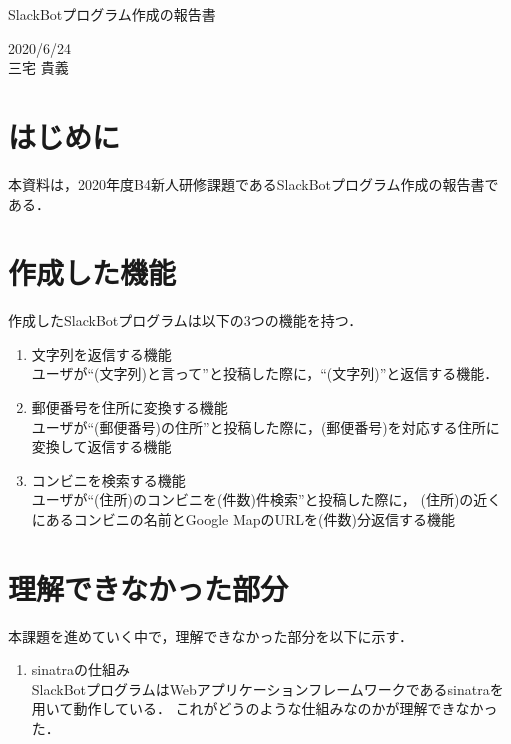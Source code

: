\documentclass[12pt]{jsarticle}
\begin{document}
\begin{center}
{\LARGE SlackBotプログラム作成の報告書}
\end{center}

\begin{flushright}
  2020/6/24\\
  三宅 貴義
\end{flushright}
\section{はじめに}
\label{sec:introduction}
本資料は，2020年度B4新人研修課題であるSlackBotプログラム作成の報告書である．


\section{作成した機能}\label{sec:hoge}
作成したSlackBotプログラムは以下の3つの機能を持つ．

\begin{enumerate}
  \item 文字列を返信する機能\\
        ユーザが“(文字列)と言って”と投稿した際に，“(文字列)”と返信する機能．
  \item 郵便番号を住所に変換する機能\\
        ユーザが“(郵便番号)の住所”と投稿した際に，(郵便番号)を対応する住所に変換して返信する機能
  \item コンビニを検索する機能\\
        ユーザが“(住所)のコンビニを(件数)件検索”と投稿した際に，
        (住所)の近くにあるコンビニの名前とGoogle MapのURLを(件数)分返信する機能
\end{enumerate}


\section{理解できなかった部分}
本課題を進めていく中で，理解できなかった部分を以下に示す．

\begin{enumerate}
  \item sinatraの仕組み\\
        SlackBotプログラムはWebアプリケーションフレームワークであるsinatraを用いて動作している．
        これがどうのような仕組みなのかが理解できなかった．
\end{enumerate}
\end{document}
